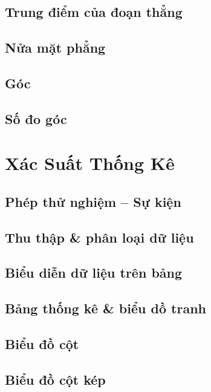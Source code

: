 \documentclass{article}
\numberwithin{equation}{section}
\begin{document}
\subsection{Trung điểm của đoạn thẳng}

\subsection{Nửa mặt phẳng}

\subsection{Góc}

\subsection{Số đo góc}


\section{Xác Suất Thống Kê}

\subsection{Phép thử nghiệm -- Sự kiện}

\subsection{Thu thập \& phân loại dữ liệu}

\subsection{Biểu diễn dữ liệu trên bảng}

\subsection{Bảng thống kê \& biểu dồ tranh}

\subsection{Biểu đồ cột}

\subsection{Biểu đồ cột kép}
\end{document}
